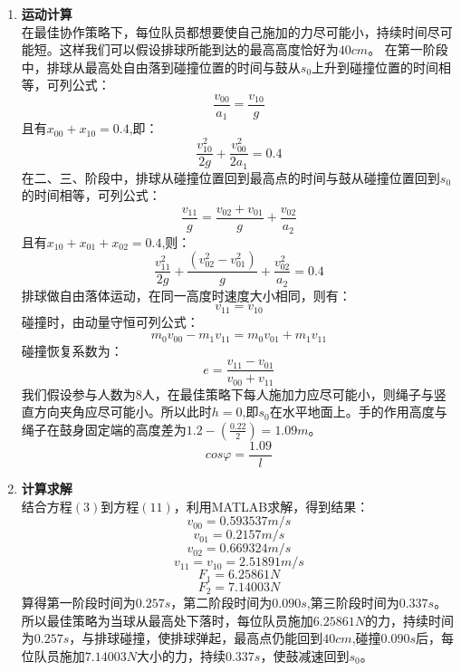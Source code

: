 \documentclass{cumcm}
\begin{document}
\begin{enumerate}
\item \textbf{运动计算}\\
在最佳协作策略下，每位队员都想要使自己施加的力尽可能小，持续时间尽可能短。这样我们可以假设排球所能到达的最高高度恰好为$40cm$。
在第一阶段中，排球从最高处自由落到碰撞位置的时间与鼓从$s_0$上升到碰撞位置的时间相等，可列公式：
\begin{equation}
\frac{v_{00}}{a_1}=\frac{v_{10}}{g}
\end{equation}
且有$x_{00}+x_{10}=0.4$,即：
\begin{equation}
\frac{v^2_{10}}{2g}+\frac{v^2_{00}}{2a_1}=0.4
\end{equation}
在二、三、阶段中，排球从碰撞位置回到最高点的时间与鼓从碰撞位置回到$s_0$的时间相等，可列公式：
\begin{equation}
\frac{v_{11}}{g}=\frac{v_{02}+v_{01}}{g}+\frac{v_{02}}{a_2}
\end{equation}
且有$x_{10}+x_{01}+x_{02}=0.4$,则：
\begin{equation}
\frac{v^2_{11}}{2g}+\frac{(v^2_{02}-v^2_{01})}{g}+\frac{v^2_{02}}{a_2}=0.4
\end{equation}
排球做自由落体运动，在同一高度时速度大小相同，则有：
\begin{equation}
v_{11}=v_{10}
\end{equation}
碰撞时，由动量守恒可列公式：
\begin{equation}
m_0v_{00}-m_1v_{11}=m_0v_{01}+m_1v_{11}
\end{equation}
碰撞恢复系数为：
\begin{equation}
e=\frac{v_{11}-v_{01}}{v_{00}+v_{11}}
\end{equation}
我们假设参与人数为$8$人，在最佳策略下每人施加力应尽可能小，则绳子与竖直方向夹角应尽可能小。所以此时$h=0$,即$s_0$在水平地面上。手的作用高度与绳子在鼓身固定端的高度差为$1.2-(\frac{0.22}{2})=1.09m$。
\begin{equation}
cos\varphi=\frac{1.09}{l}
\end{equation}
\item \textbf{计算求解}\\
结合方程$(3)$到方程$(11)$，利用MATLAB求解，得到结果：
$$v_{00}=0.593537m/s$$
$$v_{01}=0.2157m/s$$
$$v_{02}=0.669324m/s$$
$$v_{11}=v_{10}=2.51891m/s$$
$$F_1=6.25861N$$ 
$$F_2=7.14003N$$
\quad \quad
算得第一阶段时间为$0.257s$，第二阶段时间为$0.090s$,第三阶段时间为$0.337s$。
所以最佳策略为当球从最高处下落时，每位队员施加$6.25861N$的力，持续时间为$0.257s$，与排球碰撞，使排球弹起，最高点仍能回到$40cm$,碰撞$0.090s$后，每位队员施加$7.14003N$大小的力，持续$0.337s$，使鼓减速回到$s_0$。
\end{enumerate}
\end{document}
